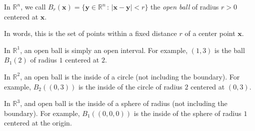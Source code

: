 \documentclass{ximera}
\begin{document}
\begin{definition}
In $\mathbb{R}^n$, we call $B_r(\mathbf{x})=\{\mathbf{y}\in\mathbb{R}^n\,:\,|\mathbf{x}-\mathbf{y}|<r\}$ the \emph{open ball} of radius $r>0$ centered at $\mathbf{x}$.
\end{definition}

In words, this is the set of points within a fixed distance $r$ of a center point $\mathbf{x}$.


\begin{example}
In $\mathbb{R}^1$, an open ball is simply an open interval. For example, $(1,3)$ is the ball $B_1(2)$ of radius $1$ centered at $2$.




In $\mathbb{R}^2$, an open ball is the inside of a circle (not including the boundary). For example, $B_2((0,3))$ is the inside of the circle of radius $2$ centered at $(0,3)$.

%
%


In $\mathbb{R}^3$, and open ball is the inside of a sphere of radius (not including the boundary). For example, $B_1((0,0,0))$ is the inside of the sphere of radius $1$ centered at the origin.


\end{example}
\end{document}
